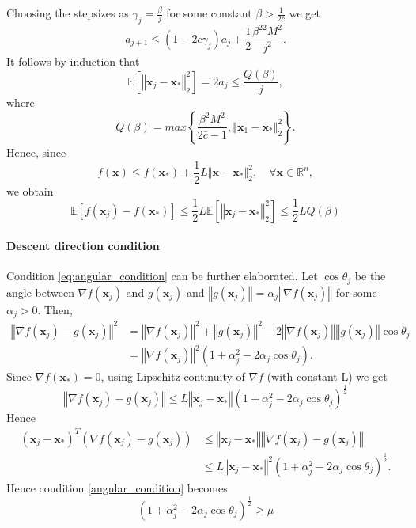 \documentclass{article}
\renewcommand{\vec}[1]{\boldsymbol{#1}}
\newcommand{\norm}[1]{\left\Vert #1 \right\Vert}
\begin{document}
Choosing the stepsizes as $\gamma_j = \frac{\beta}{j}$ for some constant $\beta>\frac{1}{2\bar{c}}$ we get
\begin{equation}
		a_{j+1} \leq (1-2\bar{c}\gamma_j)a_j + \frac{1}{2}\frac{\beta^22M^2}{j^2}.
\end{equation}
It follows by induction that
\begin{equation}
	\mathbb{E}[\norm{\vec{x}_j - \vec{x}_*}^2_2] = 2a_j\leq \frac{Q(\beta)}{j},
\end{equation}
where 
\begin{equation}
	Q(\beta) = max\left\{\frac{\beta^2M^2}{2\bar{c}-1},\norm{\vec{x}_1 - \vec{x}_*}^2_2 \right\}.
\end{equation}
Hence, since
\begin{equation}
	f(\vec{x})\leq f(\vec{x}_*) + \frac{1}{2}L\norm{\vec{x} - \vec{x}_*}^2_2, \quad \forall \vec{x} \in \mathbb{R}^n,
\end{equation}
we obtain
\begin{equation}
	\mathbb{E}[f(\vec{x}_j)-f(\vec{x}_*)] \leq \frac{1}{2} L \mathbb{E}[\norm{\vec{x}_j - \vec{x}_*}^2_2] \leq \frac{1}{2}LQ(\beta)
\end{equation}

\paragraph{Descent direction condition} Condition \ref{eq:angular_condition} can be further elaborated.
Let $\cos\theta_j$ be the angle between $\nabla f(\vec{x}_j)$ and $g(\vec{x}_j)$ and $\norm{g(\vec{x}_j)} = \alpha_j \norm{\nabla f(\vec{x}_j)}$ for some $\alpha_j>0$.
Then,
\begin{align}
	\norm{\nabla f(\vec{x}_j)-g(\vec{x}_j)}^2 &= \norm{\nabla f(\vec{x}_j)}^2 + \norm{g(\vec{x}_j)}^2 -2\norm{\nabla f(\vec{x}_j)}\norm{g(\vec{x}_j)}\cos\theta_j\\
	&=  \norm{\nabla f(\vec{x}_j)}^2(1+\alpha_j^2-2\alpha_j \cos\theta_j).
\end{align}
Since $\nabla f(\vec{x}_*)=0$, using Lipschitz continuity of $\nabla f$ (with constant L) we get
\begin{equation}
	\norm{\nabla f(\vec{x}_j)-g(\vec{x}_j)} \leq L\norm{\vec{x}_j-\vec{x}_*} (1+\alpha_j^2-2\alpha_j \cos\theta_j)^{\frac{1}{2}}
\end{equation}
Hence
\begin{align}
(\vec{x}_j-\vec{x}_*)^T (\nabla f(\vec{x}_j) -g(\vec{x}_j)) &\leq \norm{\vec{x}_j-\vec{x}_*} \norm{\nabla f(\vec{x}_j) -g(\vec{x}_j)}\\
&\leq L\norm{\vec{x}_j-\vec{x}_*}^2 (1+\alpha_j^2-2\alpha_j \cos\theta_j)^{\frac{1}{2}}.
\end{align}
Hence condition \ref{angular_condition} becomes
\begin{equation}
	(1+\alpha_j^2-2\alpha_j \cos\theta_j)^{\frac{1}{2}} \geq \mu
\end{equation}
\end{document}
